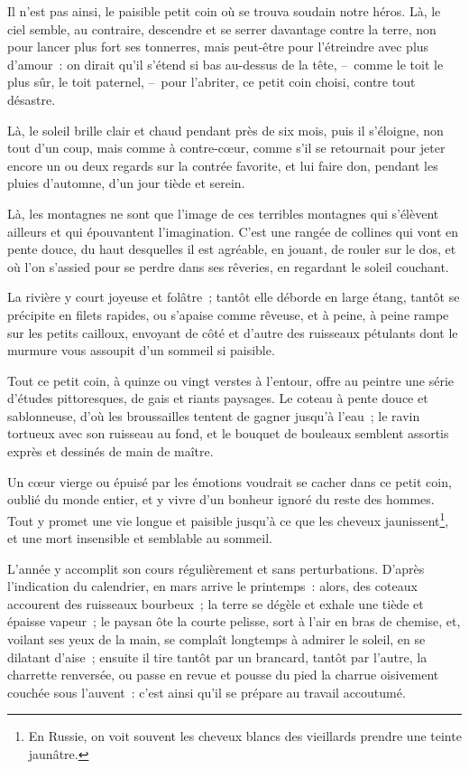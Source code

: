\documentclass[french,twoside]{book} %
\begin{document}
Il n’est pas ainsi, le paisible petit coin où se trouva soudain notre héros. Là, le ciel semble, au contraire, descendre et se serrer davantage contre la terre, non pour lancer plus fort ses tonnerres, mais peut-être pour l’étreindre avec plus d’amour : on dirait qu’il s’étend si bas au-dessus de la tête, – comme le toit le plus sûr, le toit paternel, – pour l’abriter, ce petit coin choisi, contre tout désastre.\par
Là, le soleil brille clair et chaud pendant près de six mois, puis il s’éloigne, non tout d’un coup, mais comme à contre-cœur, comme s’il se retournait pour jeter encore un ou deux regards sur la contrée favorite, et lui faire don, pendant les pluies d’automne, d’un jour tiède et serein.\par
Là, les montagnes ne sont que l’image de ces terribles montagnes qui s’élèvent ailleurs et qui épouvantent l’imagination. C’est une rangée de collines qui vont en pente douce, du haut desquelles il est agréable, en jouant, de rouler sur le dos, et où l’on s’assied pour se perdre dans ses rêveries, en regardant le soleil couchant.\par
La rivière y court joyeuse et folâtre ; tantôt elle déborde en large étang, tantôt se précipite en filets rapides, ou s’apaise comme rêveuse, et à peine, à peine rampe sur les petits cailloux, envoyant de côté et d’autre des ruisseaux pétulants dont le murmure vous assoupit d’un sommeil si paisible.\par
Tout ce petit coin, à quinze ou vingt verstes à l’entour, offre au peintre une série d’études pittoresques, de gais et riants paysages. Le coteau à pente douce et sablonneuse, d’où les broussailles tentent de gagner jusqu’à l’eau ; le ravin tortueux avec son ruisseau au fond, et le bouquet de bouleaux semblent assortis exprès et dessinés de main de maître.\par
Un cœur vierge ou épuisé par les émotions voudrait se cacher dans ce petit coin, oublié du monde entier, et y vivre d’un bonheur ignoré du reste des hommes. Tout y promet une vie longue et paisible jusqu’à ce que les cheveux jaunissent\footnote{En Russie, on voit souvent les cheveux blancs des vieillards prendre une teinte jaunâtre.}, et une mort insensible et semblable au sommeil.\par
L’année y accomplit son cours régulièrement et sans perturbations. D’après l’indication du calendrier, en mars arrive le printemps : alors, des coteaux accourent des ruisseaux bourbeux ; la terre se dégèle et exhale une tiède et épaisse vapeur ; le paysan ôte la courte pelisse, sort à l’air en bras de chemise, et, voilant ses yeux de la main, se complaît longtemps à admirer le soleil, en se dilatant d’aise ; ensuite il tire tantôt par un brancard, tantôt par l’autre, la charrette renversée, ou passe en revue et pousse du pied la charrue oisivement couchée sous l’auvent : c’est ainsi qu’il se prépare au travail accoutumé.\par
\end{document}
